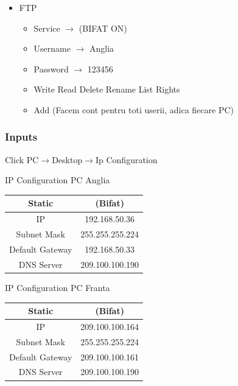 \documentclass{article}
\begin{document}
\begin{itemize}
\begin{itemize}
            \item Service $\rightarrow$ (BIFAT ON)
            \item aici o sa ne vedem inregistrarile samd.
            \item tine minte 3 cuvinte: Authentification Acreditation Accounting
        \end{itemize}
    \item FTP
        \begin{itemize}
            \item Service $\rightarrow$ (BIFAT ON)
            \item Username $\rightarrow$ Anglia
            \item Password $\rightarrow$ 123456
            \item Write Read Delete Rename List Rights
            \item Add (Facem cont pentru toti userii, adica fiecare PC)
        \end{itemize}

    

    
\end{itemize}



\subsubsection{Inputs}
Click PC$\rightarrow$Desktop$\rightarrow$Ip Configuration

\begin{center}
    IP Configuration PC Anglia
\end{center}
\begin{center}
    \begin{tabular}{|c|c|}\hline
         Static & (Bifat)  \\ \hline \hline
         IP & 192.168.50.36  \\ \hline
         Subnet Mask & 255.255.255.224 \\ \hline
         Default Gateway & 192.168.50.33 \\ \hline
         DNS Server & 209.100.100.190 \\ \hline
    \end{tabular}
\end{center}


\begin{center}
    IP Configuration PC Franta
\end{center}
\begin{center}
    \begin{tabular}{|c|c|}\hline
         Static & (Bifat)  \\ \hline \hline
         IP & 209.100.100.164  \\ \hline
         Subnet Mask & 255.255.255.224 \\ \hline
         Default Gateway & 209.100.100.161 \\ \hline
         DNS Server & 209.100.100.190 \\ \hline
    \end{tabular}
\end{center}
\end{document}

